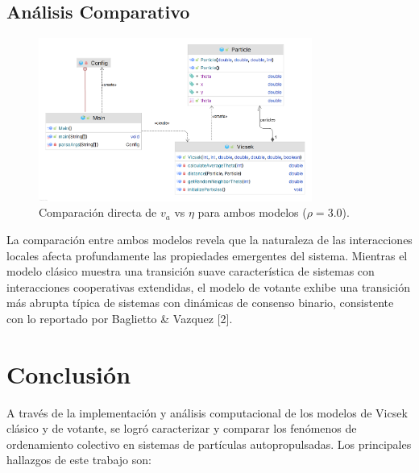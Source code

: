 \documentclass{article}
\begin{document}
\subsection{Análisis Comparativo}
\begin{figure}[H]
\centering
\includegraphics[width=0.8\textwidth]{TP2_UML.png}
\caption{Comparación directa de $v_a$ vs $\eta$ para ambos modelos ($\rho = 3.0$).}
\label{fig:comparacion_modelos}
\end{figure}

La comparación entre ambos modelos revela que la naturaleza de las interacciones locales afecta profundamente las propiedades emergentes del sistema. Mientras el modelo clásico muestra una transición suave característica de sistemas con interacciones cooperativas extendidas, el modelo de votante exhibe una transición más abrupta típica de sistemas con dinámicas de consenso binario, consistente con lo reportado por Baglietto \& Vazquez [2].

\section{Conclusión}
A través de la implementación y análisis computacional de los modelos de Vicsek clásico y de votante, se logró caracterizar y comparar los fenómenos de ordenamiento colectivo en sistemas de partículas autopropulsadas. Los principales hallazgos de este trabajo son:
\end{document}

